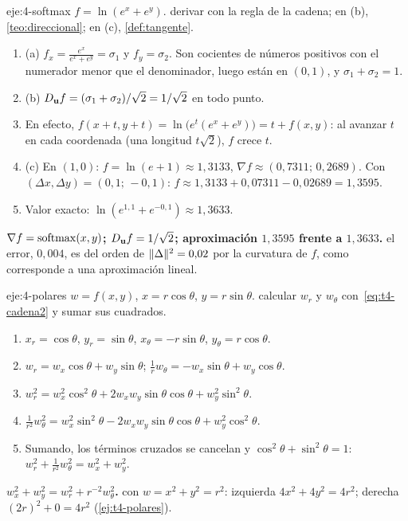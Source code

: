 \begin{solucion}{eje:4-softmax}
\datos $f=\ln(e^x+e^y)$.
\planteamiento derivar con la regla de la cadena; en (b), \cref{teo:direccional}; en (c), \cref{def:tangente}.
\pasos
\begin{enumerate}[label=\arabic*.]
  \item (a) $f_x=\frac{e^x}{e^x+e^y}=\sigma_1$ y $f_y=\sigma_2$. Son cocientes de números positivos con el numerador menor que el denominador, luego están en $(0,1)$, y $\sigma_1+\sigma_2=1$.
  \item (b) $D_{\mathbf{u}}f=(\sigma_1+\sigma_2)/\sqrt2=1/\sqrt2$ en todo punto.
  \item En efecto, $f(x+t,y+t)=\ln\bigl(e^t(e^x+e^y)\bigr)=t+f(x,y)$: al avanzar $t$ en cada coordenada (una longitud $t\sqrt2$), $f$ crece $t$.
  \item (c) En $(1,0)$: $f=\ln(e+1)\approx1{,}3133$, $\nabla f\approx(0{,}7311;\,0{,}2689)$. Con $(\Delta x,\Delta y)=(0{,}1;\,-0{,}1)$: $f\approx1{,}3133+0{,}07311-0{,}02689=1{,}3595$.
  \item Valor exacto: $\ln(e^{1{,}1}+e^{-0{,}1})\approx1{,}3633$.
\end{enumerate}
\resultado \textbf{$\nabla f=\operatorname{softmax}(x,y)$; $D_{\mathbf{u}}f=1/\sqrt2$; aproximación $1{,}3595$ frente a $1{,}3633$.}
\comprobacion el error, $0{,}004$, es del orden de $\lVert\Delta\rVert^2=0{,}02$ por la curvatura de $f$, como corresponde a una aproximación lineal.
\end{solucion}

\begin{solucion}{eje:4-polares}
\datos $w=f(x,y)$, $x=r\cos\theta$, $y=r\sin\theta$.
\planteamiento calcular $w_r$ y $w_\theta$ con~\eqref{eq:t4-cadena2} y sumar sus cuadrados.
\pasos
\begin{enumerate}[label=\arabic*.]
  \item $x_r=\cos\theta$, $y_r=\sin\theta$, $x_\theta=-r\sin\theta$, $y_\theta=r\cos\theta$.
  \item $w_r=w_x\cos\theta+w_y\sin\theta$; $\frac1rw_\theta=-w_x\sin\theta+w_y\cos\theta$.
  \item $w_r^2=w_x^2\cos^2\theta+2w_xw_y\sin\theta\cos\theta+w_y^2\sin^2\theta$.
  \item $\frac{1}{r^2}w_\theta^2=w_x^2\sin^2\theta-2w_xw_y\sin\theta\cos\theta+w_y^2\cos^2\theta$.
  \item Sumando, los términos cruzados se cancelan y $\cos^2\theta+\sin^2\theta=1$: $w_r^2+\frac{1}{r^2}w_\theta^2=w_x^2+w_y^2$.
\end{enumerate}
\resultado \textbf{$w_x^2+w_y^2=w_r^2+r^{-2}w_\theta^2$.}
\comprobacion con $w=x^2+y^2=r^2$: izquierda $4x^2+4y^2=4r^2$; derecha $(2r)^2+0=4r^2$ (\cref{ej:t4-polares}).
\end{solucion}

